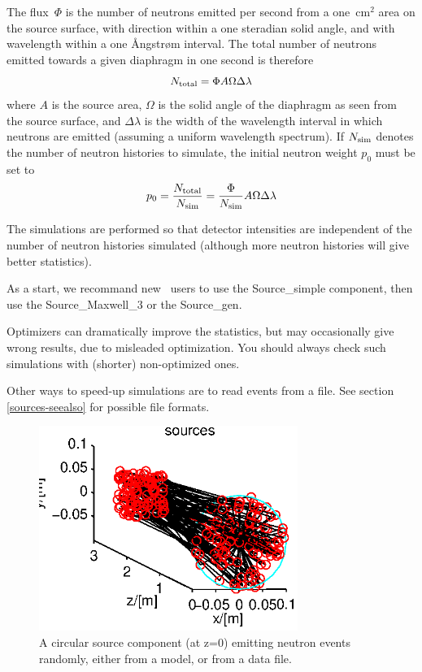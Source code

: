 The flux~$\Phi$ is the number of neutrons emitted per second from a
one~cm$^2$ area on the source surface, with direction within a one
steradian solid angle, and with wavelength within a one {\AA}ngstr{\o}m
interval. The total number of neutrons emitted towards a given diaphragm
in one second is therefore
$$ N_{\rm total} = \Phi A \Omega \Delta\lambda $$
where $A$ is the source area, $\Omega$ is the solid angle of the
diaphragm as seen from the source surface, and $\Delta\lambda$ is the
width of the wavelength interval in which neutrons are emitted (assuming
a uniform wavelength spectrum). If $N_{\rm sim}$ denotes the number of
neutron histories to simulate, the initial neutron weight $p_0$ must be set to
$$ p_0 = \frac{N_{\rm total}}{N_{\rm sim}} =
    \frac{\Phi}{N_{\rm sim}} A \Omega \Delta\lambda $$

The simulations are performed so that detector intensities
are independent of the number of neutron histories simulated
(although more neutron histories will give better statistics).

As a start, we recommand new \MCS\ users to use the Source\_simple component, then use the Source\_Maxwell\_3 or the Source\_gen.

Optimizers can dramatically improve the statistics, but may occasionally 
give wrong results, due to misleaded optimization. 
You should always check such simulations with (shorter) non-optimized ones.

Other ways to speed-up simulations are to read events from a file. See section \ref{sources-seealso} for possible file formats.

\begin{figure}
  \begin{center}
    \includegraphics[width=0.75\textwidth]{figures/sources.eps}
  \end{center}
\caption{A circular source component (at z=0) emitting neutron events randomly, either from a model, or from a data file.}
\label{f:source}
\end{figure}


